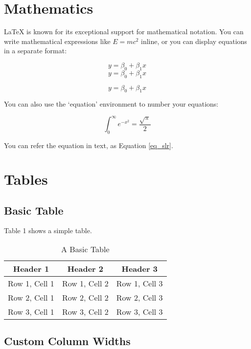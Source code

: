 \documentclass{article}
\begin{document}
\newpage
\section{Mathematics}

LaTeX is known for its exceptional support for mathematical notation. You can write mathematical expressions like $E = mc^{2}$ inline, or you can display equations in a separate format:

\[y = \beta_0 + \beta_1 x\]
$$y = \beta_0 + \beta_1 x$$

\begin{equation}
    y = \beta_0 + \beta_1 x
    \label{eq_slr}
\end{equation}

You can also use the ‘equation’ environment to number your equations:

\begin{equation}
    \int_0^\infty e^{-x^2} = \frac{\sqrt{\pi}}{2}
    \label{eq_1}
\end{equation}

You can refer the equation in text, as Equation \ref{eq_slr}.



\section{Tables}
\subsection{Basic Table}
Table 1 shows a simple table.

\begin{table}[h] %
    \centering
    \begin{tabular}{|c|c|c|} %
        \hline
        \textbf{Header 1} & \textbf{Header 2} & \textbf{Header 3} \\
        \hline
        Row 1, Cell 1 & Row 1, Cell 2 & Row 1, Cell 3\\
        \hline
        Row 2, Cell 1 & Row 2, Cell 2 & Row 2, Cell 3\\
        Row 3, Cell 1 & Row 3, Cell 2 & Row 3, Cell 3\\
        \hline
        
    \end{tabular}
    \caption{A Basic Table}
    \label{tab:basic table}
\end{table}

\subsection{Custom Column Widths}
\end{document}
